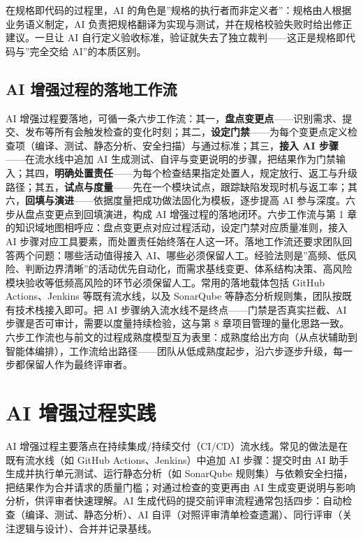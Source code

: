 \documentclass[
]{ctexbook}
\begin{document}
在规格即代码的过程里，AI
的角色是''规格的执行者而非定义者''：规格由人根据业务语义制定，AI
负责把规格翻译为实现与测试，并在规格校验失败时给出修正建议。一旦让 AI
自行定义验收标准，验证就失去了独立裁判------这正是规格即代码与''完全交给
AI''的本质区别。

\subsection{AI
增强过程的落地工作流}\label{ai-ux589eux5f3aux8fc7ux7a0bux7684ux843dux5730ux5de5ux4f5cux6d41}

AI
增强过程要落地，可循一条六步工作流：其一，\textbf{盘点变更点}------识别需求、提交、发布等所有会触发检查的变化时刻；其二，\textbf{设定门禁}------为每个变更点定义检查项（编译、测试、静态分析、安全扫描）与通过标准；其三，\textbf{接入
AI 步骤}------在流水线中追加 AI
生成测试、自评与变更说明的步骤，把结果作为门禁输入；其四，\textbf{明确处置责任}------为每个检查结果指定处置人，规定放行、返工与升级路径；其五，\textbf{试点与度量}------先在一个模块试点，跟踪缺陷发现时机与返工率；其六，\textbf{回填与演进}------依据度量把成功做法固化为模板，逐步提高
AI 参与深度。六步从盘点变更点到回填演进，构成 AI
增强过程的落地闭环。六步工作流与第 1
章的知识域地图相呼应：盘点变更点对应过程活动，设定门禁对应质量准则，接入
AI
步骤对应工具要素，而处置责任始终落在人这一环。落地工作流还要求团队回答两个问题：哪些活动值得接入
AI、哪些必须保留人工。经验法则是''高频、低风险、判断边界清晰''的活动优先自动化，而需求基线变更、体系结构决策、高风险模块验收等低频高风险的环节必须保留人工。常用的落地载体包括
GitHub Actions、Jenkins 等既有流水线，以及 SonarQube
等静态分析规则集，团队按既有技术栈接入即可。把 AI
步骤纳入流水线不是终点------门禁是否真实拦截、AI
步骤是否可审计，需要以度量持续检验，这与第 8
章项目管理的量化思路一致。六步工作流也与前文的过程成熟度模型互为表里：成熟度给出方向（从点状辅助到智能体编排），工作流给出路径------团队从低成熟度起步，沿六步逐步升级，每一步都保留人作为最终评审者。

\section{AI 增强过程实践}\label{ai-ux589eux5f3aux8fc7ux7a0bux5b9eux8df5}

AI
增强过程主要落点在持续集成/持续交付（CI/CD）流水线。常见的做法是在既有流水线（如
GitHub Actions、Jenkins）中追加 AI 步骤：提交时由 AI
助手生成并执行单元测试、运行静态分析（如 SonarQube
规则集）与依赖安全扫描，把结果作为合并请求的质量门槛；对通过检查的变更再由
AI 生成变更说明与影响分析，供评审者快速理解。AI
生成代码的提交前评审流程通常包括四步：自动检查（编译、测试、静态分析）、AI
自评（对照评审清单检查遗漏）、同行评审（关注逻辑与设计）、合并并记录基线。
\end{document}
